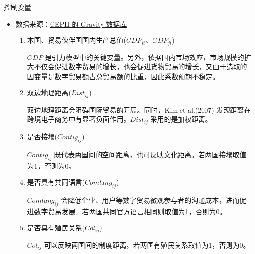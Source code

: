 \documentclass{beamer}
\begin{document}
\begin{frame}{控制变量}
    \begin{itemize}
        \item 数据来源：\underline{CEPII 的 Gravity 数据库}
        \begin{enumerate}
            \item 本国、贸易伙伴国国内生产总值($GDP_{it} \text{、} GDP_{jt}$) \\
            \begin{scriptsize} 
                $GDP$ 是引力模型中的关键变量。另外，依据国内市场效应，市场规模的扩大不仅会促进数字贸易的增长，也会促进货物贸易的增长，又由于选取的因变量是数字贸易额占总贸易额的比重，因此系数预期不稳定。
            \end{scriptsize}
            \item 双边地理距离($Dist_{ij}$) \\
            \begin{scriptsize}
                双边地理距离会阻碍国际贸易的开展。同时，Kim et al.(2007) 发现距离在跨境电子商务中有显著负面作用。$Dist_{ij}$ 采用的是加权距离。
            \end{scriptsize}
            \item 是否接壤($Contig_{ij}$) \\
            \begin{scriptsize}
                $Contig_{ij}$ 既代表两国间的空间距离，也可反映文化距离。若两国接壤取值为1，否则为0。
            \end{scriptsize}
            \item 是否具有共同语言($Comlang_{ij}$) \\
            \begin{scriptsize}
                $Comlang_{ij}$ 会降低企业、用户等数字贸易微观参与者的沟通成本，进而促进数字贸易发展。若两国共同官方语言相同则取值为1，否则为0。
            \end{scriptsize}
            \item 是否具有殖民关系($Col_{ij}$) \\
            \begin{scriptsize}
                $Col_{ij}$ 可以反映两国间的制度距离。若两国有殖民关系取值为1，否则为0。
            \end{scriptsize}
        \end{enumerate}
    \end{itemize}
\end{frame}
\end{document}
